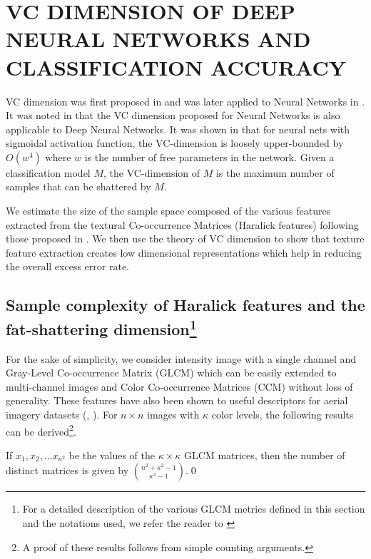 \documentclass[11pt,a4paper]{article}
\begin{document}
\section{VC DIMENSION OF DEEP NEURAL NETWORKS AND CLASSIFICATION ACCURACY}\label{vc_dim_and_accuracy}

VC dimension was first proposed in \cite{vapnik:264} and was later applied to Neural Networks in \cite{Bartlett_vapnik-chervonenkisdimension}. It was noted in \cite{BianchiniS14} that the VC dimension proposed for Neural Networks is also applicable to Deep Neural Networks. It was shown in \cite{Bartlett_vapnik-chervonenkisdimension} that for neural nets with sigmoidal activation function, the VC-dimension is loosely upper-bounded by $O(w^4)$ where $w$ is the number of free parameters in the network. Given a classification model $M$, the VC-dimension of $M$ is the maximum number of samples that can be shattered by $M$.

We estimate the size of the sample space composed of the various features extracted from the  textural Co-occurrence Matrices (Haralick features) following those proposed in \cite{haralick1973}. We then use the theory of VC dimension to show that texture feature extraction creates low dimensional representations which help in reducing the overall excess error rate.     

\subsection[Sample complexity of Haralick features and the fat-shattering dimension]{Sample complexity of Haralick features and the \\ fat-shattering dimension\footnote{For a detailed description of the various GLCM metrics defined in this section and the notations used, we refer the reader to \cite{haralick1973}}}

 For the sake of simplicity, we consider intensity image with a single channel and Gray-Level Co-occurrence Matrix (GLCM) which can be easily extended to multi-channel images and Color Co-occurrence Matrices (CCM) without loss of generality. These features have also been shown to useful descriptors for aerial imagery datasets (\cite{basu2015deepsat}, \cite{basu2015semiautomated}). For $n{\times}n$ images with $\kappa$ color levels, the following results can be derived\footnote{A proof of these results follows from simple counting arguments.}.  

\begin{proposition}
If $x_1, x_2, \ldots x_{\kappa^2}$ be the values of the $\kappa{\times}\kappa$ GLCM matrices, then the number of distinct matrices is given by $\binom{n^2+\kappa^2-1}{\kappa^2-1}$.\qed
\end{proposition}
\end{document}
